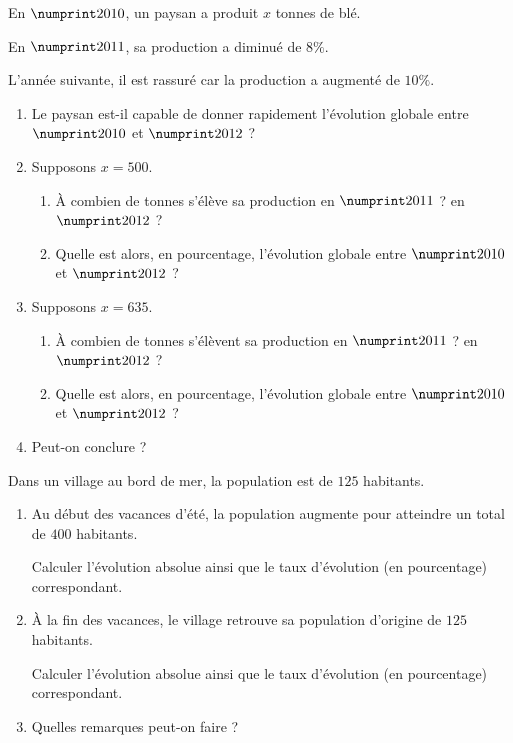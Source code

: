 \documentclass[10pt,openright,twoside,french]{book}
\begin{document}

\exo En $\NP{2010}$, un paysan a produit $x$ tonnes de blé.\par
En $\NP{2011}$, sa production a diminué de $8\%$.\par
L'année suivante, il est rassuré car la production a augmenté de $10\%$.

\begin{enumerate}
    \item Le paysan est-il capable de donner rapidement l'évolution globale entre $\NP{2010}$ et $\NP{2012}$ ?
    \item Supposons $x = 500$.
        \begin{enumerate}
            \item À combien de tonnes s'élève sa production en $\NP{2011}$ ? en $\NP{2012}$ ?
            \item Quelle est alors, en pourcentage, l'évolution globale entre $\NP{2010}$ et $\NP{2012}$ ?
        \end{enumerate}
    \item Supposons $x = 635$.
        \begin{enumerate}
            \item À combien de tonnes s'élèvent sa production en $\NP{2011}$ ? en $\NP{2012}$ ?
            \item Quelle est alors, en pourcentage, l'évolution globale entre $\NP{2010}$ et $\NP{2012}$ ?
        \end{enumerate}
    \item Peut-on conclure ?
\end{enumerate}\bigskip

\exo Dans un village au bord de mer, la population est de $125$ habitants.
\begin{enumerate}
    \item Au début des vacances d'été, la population augmente pour atteindre un total de $400$ habitants.\par
        Calculer l'évolution absolue ainsi que le taux d'évolution (en pourcentage) correspondant.
    \item À la fin des vacances, le village retrouve sa population d'origine de $125$ habitants.\par
        Calculer l'évolution absolue ainsi que le taux d'évolution (en pourcentage) correspondant.
    \item Quelles remarques peut-on faire ?
\end{enumerate}
\end{document}
